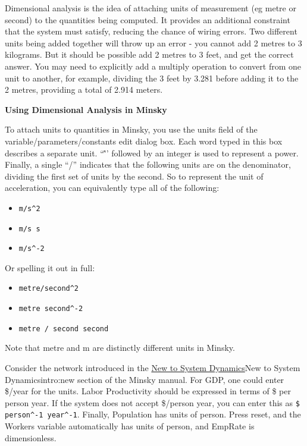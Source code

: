 Dimensional analysis is the idea of attaching units of measurement
(eg metre or second) to the quantities being computed. It provides an 
additional constraint that the system must satisfy, reducing the chance 
of wiring errors. Two different units being added together will throw up 
an error - you cannot add 2 metres to 3 kilograms. But it should be 
possible add 2 metres to 3 feet, and get the correct answer. You may need 
to explicitly add a multiply operation to convert from one unit to another,
for example, dividing the 3 feet by 3.281 before adding it to the 2 metres,
providing a total of 2.914 meters.

\textbf{Using Dimensional Analysis in Minsky}

To attach units to quantities in Minsky, you use the units field of the 
variable/parameters/constants edit dialog box. Each word typed in this box 
describes a separate unit. ``\^'' followed by an integer is used to 
represent a power. Finally, a single ``/'' indicates that the following units 
are on the denominator, dividing the first set of units by the second. So 
to represent the unit of acceleration, you can equivalently type all of the following:

\begin{itemize}
  \item \verb+m/s^2+
  \item \verb+m/s s+
  \item \verb+m/s^-2+
\end{itemize}

Or spelling it out in full:

\begin{itemize}
  \item \verb+metre/second^2+
  \item \verb+metre second^-2+
  \item \verb+metre / second second+
\end{itemize}

Note that metre and m are distinctly different units in Minsky.

Consider the network introduced in the \hyperref[ref]{New to System Dynamics}{New to System Dynamics}{}{intro:new}
section of the Minsky manual. For GDP, one could enter \$/year for the units. Labor 
Productivity should be expressed in terms of \$ per person year. If the system
does not accept \$/person year, you can enter this as \verb+$ person^-1 year^-1+. 
Finally, Population has units of person. Press reset, and the Workers variable 
automatically has units of person, and EmpRate is dimensionless.

